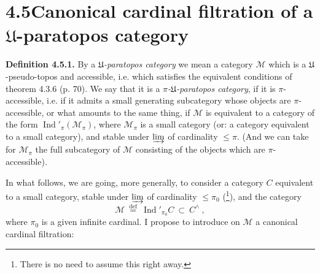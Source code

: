 \documentclass[11pt]{article}
\newcommand{\printedpage}[1]{\marginpar{\footnotesize p.~#1}}
\newcommand{\msp}[1]{\marginpar{\footnotesize [#1]}}
\newcommand{\Ind}{\operatorname{Ind}}
\begin{document}
\setcounter{footnote}{29}

\printedpage{29}

\section*{4.5\quad Canonical cardinal filtration of a $\mathfrak{U}$-paratopos category}

\textbf{Definition 4.5.1.} By a \textit{$\mathfrak{U}$-paratopos category} we mean a category $\mathcal{M}$ which is a $\mathfrak{U}$-pseudo-topos and accessible, i.e. which satisfies the equivalent conditions of theorem 4.3.6 (p. 70). We say that it is a \textit{$\pi$-$\mathfrak{U}$-paratopos category}, if it is $\pi$-accessible, i.e. if it admits a small generating subcategory whose objects are $\pi$-accessible, or what amounts to the same thing, if %
$\mathcal{M}$ is equivalent to a category of the form $\Ind'_{\pi}(\mathcal{M}_{\pi})$, where $\mathcal{M}_{\pi}$ is a small category (or: a category equivalent to a small category), and stable under $\varinjlim$ of cardinality $\leqslant \pi$. (And we can take for $\mathcal{M}_{\pi}$ the full subcategory of $\mathcal{M}$ consisting of the objects
\msp{page 107}
which are $\pi$-accessible).

In what follows, we are going, more generally, to consider a category $C$ equivalent to a small category, stable under $\varinjlim$ of cardinality $\leqslant \pi_0$ (\footnote{There is no need to assume this right away.}), and the category
\[
\mathcal{M} \ \overset{\text{def}}{=}\ \Ind'_{\pi_0}C \ \subset\ C^{\wedge}\ ,
\tag*{(4.5.1)}
\]
where $\pi_0$ is a given infinite cardinal. I propose to introduce on $\mathcal{M}$ a canonical cardinal filtration:
\end{document}
